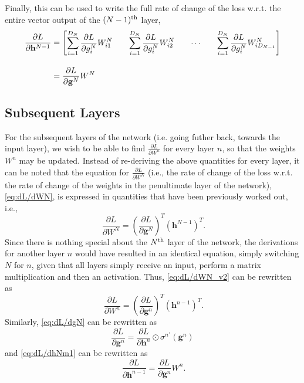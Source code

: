 \documentclass{article}
\newcommand{\pd}[0]{\phantom{.}}
\begin{document}
Finally, this can be used to write the full rate of change of the loss w.r.t. the entire vector output of the $(N-1)\textsuperscript{th}$ layer,
\begin{align}
    \label{eq:dL/dhNm1}
    \frac{\partial L}{\partial \mathbf{h}^{N-1}} &=
    \begin{bmatrix}
        \displaystyle\sum_{i=1}^{D_N}\frac{\partial L}{\partial g^N_i}W^N_{i1}\quad &
        \displaystyle\sum_{i=1}^{D_N}\frac{\partial L}{\partial g^N_i}W^N_{i2}\quad &
        \cdots\quad &
        \displaystyle\sum_{i=1}^{D_N}\frac{\partial L}{\partial g^N_i}W^N_{iD_{N-1}}
    \end{bmatrix}\notag \\[1em]
    &= \frac{\partial L}{\partial \mathbf{g}^N}W^N
\end{align}

\subsection{Subsequent Layers}
\label{sec:nextlayers}

For the subsequent layers of the network (i.e. going futher back, towards the input layer), we wish to be able to find $\frac{\partial L}{\partial W^n}$ for every layer $n$, so that the weights $W^n$ may be updated. Instead of re-deriving the above quantities for every layer, it can be noted that the equation for $\frac{\partial L}{\partial W^N}$ (i.e., the rate of change of the loss w.r.t. the rate of change of the weights in the penultimate layer of the network), \cref{eq:dL/dWN}, is expressed in quantities that have been previously worked out, i.e.,
\begin{equation}
    \label{eq:dL/dWN_v2}
    \pd\frac{\partial L}{\partial W^N} = \left(\frac{\partial L}{\partial \mathbf{g}^N}\right)^T\left(\mathbf{h}^{N-1}\right)^T.
\end{equation}
Since there is nothing special about the $N\textsuperscript{th}$ layer of the network, the derivations for another layer $n$ would have resulted in an identical equation, simply switching $N$ for $n$, given that all layers simply receive an input, perform a matrix multiplication and then an activation. Thus, \cref{eq:dL/dWN_v2} can be rewritten as
\begin{equation}
    \label{eq:dL/dWn}
    \pd\frac{\partial L}{\partial W^n} = \left(\frac{\partial L}{\partial \mathbf{g}^n}\right)^T\left(\mathbf{h}^{n-1}\right)^T.
\end{equation}
Similarly, \cref{eq:dL/dgN} can be rewritten as
\begin{equation}
    \label{eq:dL/dgn}
    \frac{\partial L}{\partial \mathbf{g}^n} = \frac{\partial L}{\partial \mathbf{h}^n}\odot{\sigma^n}^{\prime}\left(\mathbf{g}^n\right)
\end{equation}
and \cref{eq:dL/dhNm1} can be rewritten as
\begin{equation}
    \label{eq:dL/dhnm1}
    \pd\frac{\partial L}{\partial \mathbf{h}^{n-1}} = \frac{\partial L}{\partial \mathbf{g}^n}W^n.
\end{equation}
\end{document}
